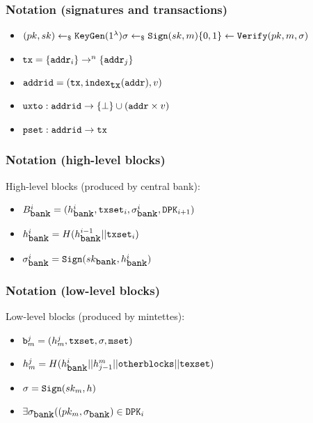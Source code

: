 \documentclass{beamer}
\begin{document}
\begin{frame}[fragile]
\frametitle{Notation (signatures and transactions)}
\begin{itemize}
\item \(
(pk, sk) \leftarrow_\$ \verb|KeyGen|(1^\lambda)\newline
\sigma \leftarrow_\$ \verb|Sign|(sk, m)\newline
\{0,1\} \leftarrow \verb|Verify|(pk, m, \sigma)
\)
\item $\verb|tx| = \{\verb|addr|_i\} \rightarrow^n \{\verb|addr|_j\}$
\item $\verb|addrid| = (\verb|tx|, \verb|index|_{\verb|tx|}(\verb|addr|), v)$
\item $\verb|uxto| : \verb|addrid| \rightarrow \{\bot\} \cup (\verb|addr| \times v)$
\item $\verb|pset| : \verb|addrid| \rightarrow \verb|tx|$
\end{itemize}
\end{frame}

\begin{frame}[fragile]
\frametitle{Notation (high-level blocks)}
High-level blocks (produced by central bank):
\begin{itemize}
\item $B_{\verb|bank|}^i = (h_{\verb|bank|}^i, \verb|txset|_i, \sigma_{\verb|bank|}^i, \verb|DPK|_{i+1})$
\item $h_{\verb|bank|}^i = H(h_{\verb|bank|}^{i-1} || \verb|txset|_i)$
\item $\sigma_{\verb|bank|}^i = \verb|Sign|(sk_{\verb|bank|}, h_{\verb|bank|}^i)$
\end{itemize}
\end{frame}

\begin{frame}[fragile]
\frametitle{Notation (low-level blocks)}
Low-level blocks (produced by mintettes):
\begin{itemize}
\item $\verb|b|_m^j = (h_m^j, \verb|txset|, \sigma, \verb|mset|)\newline$
\item $h_m^j = H(h_{\verb|bank|}^i || h_{j-1}^m || \verb|otherblocks| || \verb|texset|)\newline$
\item $\sigma = \verb|Sign|(sk_m, h)\newline$
\item $\exists \sigma_{\verb|bank|} ((pk_m, \sigma_{\verb|bank|}) \in \verb|DPK|_{i}$
\end{itemize}
\end{frame}
\end{document}

